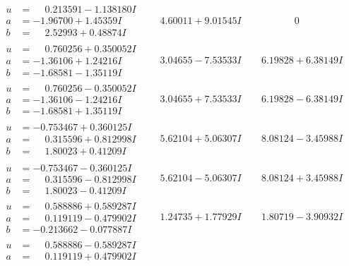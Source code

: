 \documentclass[1p]{elsarticle_modified}
\theoremstyle{definition}
\begin{document}
$$\begin{array}{c|c|c}
\begin{aligned}
u &= \phantom{-}0.213591 - 1.138180 I \\
a &= -1.96700 + 1.45359 I \\
b &= \phantom{-}2.52993 + 0.48874 I\end{aligned}
 & \phantom{-}4.60011 + 9.01545 I & \phantom{-0.000000 } 0 \\ \hline\begin{aligned}
u &= \phantom{-}0.760256 + 0.350052 I \\
a &= -1.36106 + 1.24216 I \\
b &= -1.68581 - 1.35119 I\end{aligned}
 & \phantom{-}3.04655 - 7.53533 I & \phantom{-}6.19828 + 6.38149 I \\ \hline\begin{aligned}
u &= \phantom{-}0.760256 - 0.350052 I \\
a &= -1.36106 - 1.24216 I \\
b &= -1.68581 + 1.35119 I\end{aligned}
 & \phantom{-}3.04655 + 7.53533 I & \phantom{-}6.19828 - 6.38149 I \\ \hline\begin{aligned}
u &= -0.753467 + 0.360125 I \\
a &= \phantom{-}0.315596 + 0.812998 I \\
b &= \phantom{-}1.80023 + 0.41209 I\end{aligned}
 & \phantom{-}5.62104 + 5.06307 I & \phantom{-}8.08124 - 3.45988 I \\ \hline\begin{aligned}
u &= -0.753467 - 0.360125 I \\
a &= \phantom{-}0.315596 - 0.812998 I \\
b &= \phantom{-}1.80023 - 0.41209 I\end{aligned}
 & \phantom{-}5.62104 - 5.06307 I & \phantom{-}8.08124 + 3.45988 I \\ \hline\begin{aligned}
u &= \phantom{-}0.588886 + 0.589287 I \\
a &= \phantom{-}0.119119 - 0.479902 I \\
b &= -0.213662 - 0.077887 I\end{aligned}
 & \phantom{-}1.24735 + 1.77929 I & \phantom{-}1.80719 - 3.90932 I \\ \hline\begin{aligned}
u &= \phantom{-}0.588886 - 0.589287 I \\
a &= \phantom{-}0.119119 + 0.479902 I \\

\end{aligned}
\end{array}$$
\end{document}
